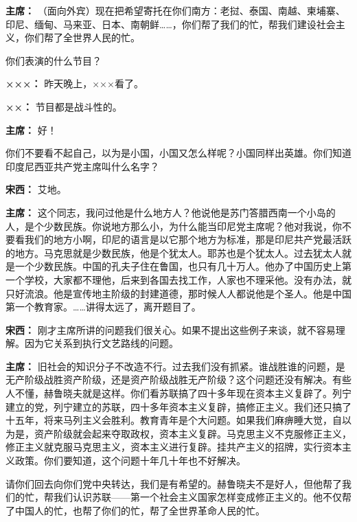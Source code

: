 \begin{list}{}
\item[\textbf{主席：}] （面向外宾）现在把希望寄托在你们南方：老挝、泰国、南越、柬埔寨、印尼、缅甸、马来亚、日本、南朝鲜……，你们帮了我们的忙，帮我们建设社会主义，你们帮了全世界人民的忙。

你们表演的什么节目？

\item[\textbf{×××：}] 昨天晚上，×××看了。

\item[\textbf{××：}] 节目都是战斗性的。

\item[\textbf{主席：}] 好！

你们不要看不起自己，以为是小国，小国又怎么样呢？小国同样出英雄。你们知道印度尼西亚共产党主席叫什么名字？

\item[\textbf{宋西：}] 艾地。

\item[\textbf{主席：}] 这个同志，我问过他是什么地方人？他说他是苏门答腊西南一个小岛的人，是个少数民族。你说地方那么小，为什么能当印尼党主席呢？他对我说，你不要看我们的地方小啊，印尼的语言是以它那个地方为标准，那是印尼共产党最活跃的地方。马克思就是少数民族，他是个犹太人。耶苏也是个犹太人。过去犹太人就是一个少数民族。中国的孔夫子住在鲁国，也只有几十万人。他办了中国历史上第一个学校，大家都不理他，后来到各国去找工作，人家也不理采他。没有办法，就只好流浪。他是宣传地主阶级的封建道德，那时候人人都说他是个圣人。他是中国第一个教育家。……讲得太远了，离开题目了。

\item[\textbf{宋西：}] 刚才主席所讲的问题我们很关心。如果不提出这些例子来谈，就不容易理解。因为它关系到执行文艺路线的问题。

\item[\textbf{主席：}] 旧社会的知识分子不改造不行。过去我们没有抓紧。谁战胜谁的问题，是无产阶级战胜资产阶级，还是资产阶级战胜无产阶级？这个问题还没有解决。有些人不懂，赫鲁晓夫就是这样。你们看苏联搞了四十多年现在资本主义复辟了。列宁建立的党，列宁建立的苏联，四十多年资本主义复辟，搞修正主义。我们还只搞了十五年，将来马列主义会胜利。教育青年是个大问题。如果我们麻痹睡大觉，自以为是，资产阶级就会起来夺取政权，资本主义复辟。马克思主义不克服修正主义，修正主义就克服马克思主义，资本主义进行复辟。挂共产主义的招牌，实行资本主义政策。你们要知道，这个问题十年几十年也不好解决。

请你们回去向你们党中央转达，我们是有希望的。赫鲁晓夫不是好人，但他帮了我们的忙，帮我们认识苏联——第一个社会主义国家怎样变成修正主义的。他不仅帮了中国人的忙，也帮了你们的忙，帮了全世界革命人民的忙。


\end{list}
